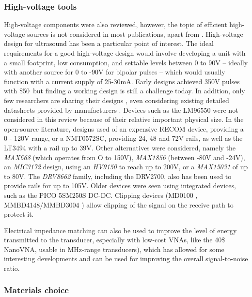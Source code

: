 \documentclass{article}
\begin{document}
\subsubsection{High-voltage tools}

High-voltage components were also reviewed, however, the topic of efficient high-voltage sources is not considered in most publications, apart from \cite{xiao_design_2013}. High-voltage design for ultrasound has been a particular point of interest. The ideal requirements for a good high-voltage design would involve developing a unit with a small footprint, low consumption, and settable levels between 0 to 90V -- ideally with another source for 0 to -90V for bipolar pulses -- which would usually function with a current supply of 25-30mA.  Early designs \cite{brown_low-cost_2002} achieved 350V pulses with \$50\, but finding a working design is still a challenge today. In addition, only few researchers are sharing their designs \cite{tang_computerized_2014}, even considering existing detailed datasheets provided by manufacturers \cite{granata_designing_2020}. Devices such as the LM96550 were not considered in this review because of their relative important physical size. In the open-source literature, designs  used of an expensive RECOM device, providing a 0 - 120V range, or a NMT0572SC, providing 24, 48 and 72V rails, as well as the LT3494 with a rail up to 39V. Other alternatives were considered, namely the \emph{MAX668} (which operates from O to 150V), \emph{MAX1856} (between -80V and -24V), an \emph{MIC3172} design, using an \emph{HV9150} to reach up to 200V, or a \emph{MAX15031} of up to 80V. The \emph{DRV8662} family, including the DRV2700, also has been used to provide rails for up to 105V. Older devices were seen using integrated devices, such as the PICO 5SM250S DC-DC. Clipping devices (MD0100 \cite{li_new_2014, sharma_development_2015}, MMBD4148/MMBD3004 \cite{ching_chu_designing_nodate}) allow clipping of the signal on the receive path to protect it.

Electrical impedance matching \cite{rathod_review_2019} can also be used to improve the level of energy transmitted to the transducer, especially with low-cost VNAs, like the 40\$ NanoVNA, usable in MHz-range transducers), which has allowed for some interesting developments \cite{garcia-rodriguez_low_2010, wei_design_2020} and can be used for improving the overall signal-to-noise ratio.

\subsubsection{Materials choice}
\end{document}
